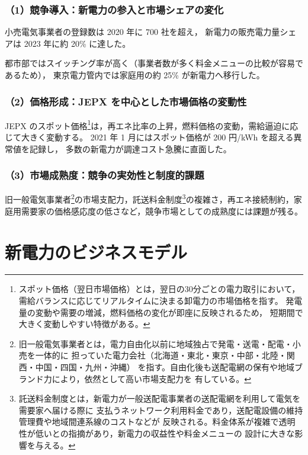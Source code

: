 \subsubsection{（1）競争導入：新電力の参入と市場シェアの変化}

小売電気事業者の登録数は 2020 年に 700 社を超え，
新電力の販売電力量シェアは 2023 年に約 20\% に達した\parencite{METI2020RetailData}。

都市部ではスイッチング率が高く（事業者数が多く料金メニューの比較が容易であるため），
東京電力管内では家庭用の約 25\% が新電力へ移行した。

\subsubsection{（2）価格形成：JEPX を中心とした市場価格の変動性}

JEPX のスポット価格\footnote{
スポット価格（翌日市場価格）とは，翌日の30分ごとの電力取引において，
需給バランスに応じてリアルタイムに決まる卸電力の市場価格を指す。
発電量の変動や需要の増減，燃料価格の変化が即座に反映されるため，
短期間で大きく変動しやすい特徴がある。
}は，再エネ比率の上昇，燃料価格の変動，需給逼迫に応じて大きく変動する。
2021 年 1 月にはスポット価格が 200 円/kWh を超える異常値を記録し，
多数の新電力が調達コスト急騰に直面した。

\subsubsection{（3）市場成熟度：競争の実効性と制度的課題}

旧一般電気事業者\footnote{
旧一般電気事業者とは，電力自由化以前に地域独占で発電・送電・配電・小売を一体的に
担っていた電力会社（北海道・東北・東京・中部・北陸・関西・中国・四国・九州・沖縄）
を指す。自由化後も送配電網の保有や地域ブランド力により，依然として高い市場支配力を
有している。
}の市場支配力，託送料金制度\footnote{
託送料金制度とは，新電力が一般送配電事業者の送配電網を利用して電気を需要家へ届ける際に
支払うネットワーク利用料金であり，送配電設備の維持管理費や地域間連系線のコストなどが
反映される。料金体系が複雑で透明性が低いとの指摘があり，新電力の収益性や料金メニューの
設計に大きな影響を与える。
}の複雑さ，再エネ接続制約，家庭用需要家の価格感応度の低さなど，競争市場としての成熟度には課題が残る。


\section{新電力のビジネスモデル}

